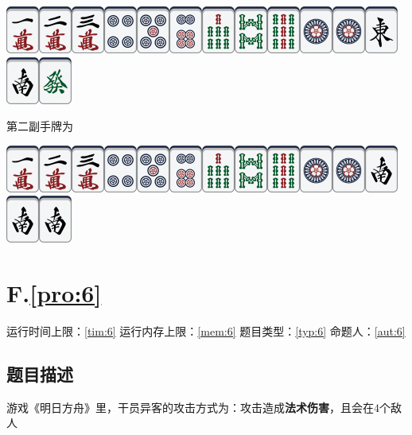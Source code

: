\documentclass[
	lang=cn,
	color=green
]{elegantbook}
\begin{document}
\begin{center}
\includegraphics[scale=0.5]{images/mahjong/1m.png}\includegraphics[scale=0.5]{images/mahjong/2m.png}\includegraphics[scale=0.5]{images/mahjong/3m.png}\includegraphics[scale=0.5]{images/mahjong/4p.png}\includegraphics[scale=0.5]{images/mahjong/5p.png}\includegraphics[scale=0.5]{images/mahjong/6p.png}\includegraphics[scale=0.5]{images/mahjong/7s.png}\includegraphics[scale=0.5]{images/mahjong/8s.png}\includegraphics[scale=0.5]{images/mahjong/9s.png}\includegraphics[scale=0.5]{images/mahjong/1p.png}\includegraphics[scale=0.5]{images/mahjong/1p.png}\includegraphics[scale=0.5]{images/mahjong/1z.png}\includegraphics[scale=0.5]{images/mahjong/2z.png}\includegraphics[scale=0.5]{images/mahjong/6z.png}
\end{center}

第二副手牌为

\begin{center}
\includegraphics[scale=0.5]{images/mahjong/1m.png}\includegraphics[scale=0.5]{images/mahjong/2m.png}\includegraphics[scale=0.5]{images/mahjong/3m.png}\includegraphics[scale=0.5]{images/mahjong/4p.png}\includegraphics[scale=0.5]{images/mahjong/5p.png}\includegraphics[scale=0.5]{images/mahjong/6p.png}\includegraphics[scale=0.5]{images/mahjong/7s.png}\includegraphics[scale=0.5]{images/mahjong/8s.png}\includegraphics[scale=0.5]{images/mahjong/9s.png}\includegraphics[scale=0.5]{images/mahjong/1p.png}\includegraphics[scale=0.5]{images/mahjong/1p.png}\includegraphics[scale=0.5]{images/mahjong/2z.png}\includegraphics[scale=0.5]{images/mahjong/2z.png}\includegraphics[scale=0.5]{images/mahjong/2z.png}
\end{center}


\newpage
\chapter*{F.\quad \ref*{pro:6}}
\begin{center}
    运行时间上限：\ref*{tim:6} \quad 运行内存上限：\ref*{mem:6} \quad 题目类型：\ref*{typ:6} \quad 命题人：\ref*{aut:6}
\end{center}

\section*{题目描述}
游戏《明日方舟》里，干员异客的攻击方式为：攻击造成\textbf{法术伤害}，且会在$4$个敌人
\end{document}
